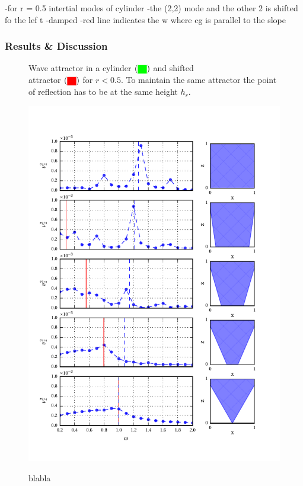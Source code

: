 -for r = 0.5 intertial modes of cylinder
-the (2,2) mode and the other 2 is shifted fo the lef t
-damped
-red line indicates the w where cg is parallel to the slope


\subsubsection{Results \& Discussion}
\begin{figure}[!bp]
      \begin{minipage}[c]{0.4\textwidth}
      \centering
      \end{minipage}\hfill
  \begin{minipage}[c]{0.6\textwidth}
      \caption{
          Wave attractor in a cylinder $\left(\text{\colorbox{green}{\textcolor{green}{o}}{\null}}\right)$
          and shifted\\ attractor $\left(\text{\colorbox{red}{\textcolor{red}{o}}{\null}}\right)$
          for $r<0.5$. To maintain the same attractor the point of reflection has to be at the same height $h_r$.
      }
      \label{cone:theorie}
      \end{minipage}\hfill
\end{figure}


\begin{figure}[!pt]
  \centering
  \includegraphics{gfx/cone/transition/transition.pdf}\label{fig:cone:transition}
  \caption{blabla}
\end{figure}



